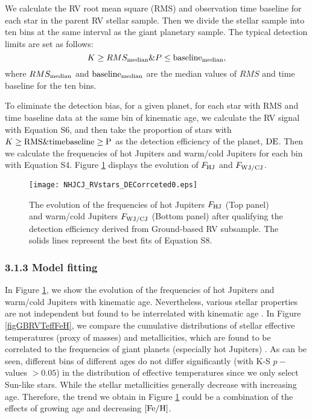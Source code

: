 \documentclass[twocolumn]{pnas-new}
\begin{document}
We calculate the RV root mean square (RMS) and observation time baseline for each star in the parent RV stellar sample.
Then we divide the stellar sample into ten bins at the same interval as the giant planetary sample.
The typical detection limits are set as follows:
\begin{equation}
  K \ge RMS_{\rm median} \&
  P \le \rm baseline_{\rm median},
\end{equation}
where $RMS_{\rm median}$ and
$\rm baseline_{\rm median}$ are the median values of $RMS$ and time baseline for the ten bins.


To eliminate the detection bias, for a given planet, for each star with RMS and time baseline data at the same bin of kinematic age, we calculate the RV signal with Equation S6, and then take the proportion of stars with $K \ge \rm RMS \& time baseline \ge P$ as the detection efficiency of the planet, $\rm DE$.
Then we calculate the frequencies of hot Jupiters and warm/cold Jupiters for each bin with Equation S4.
Figure \ref{figGBRVOccurrencerateDE} displays the evolution of $F_{\rm HJ}$ and $F_{\rm WJ/CJ}$.

\begin{figure}[!t]
\centering
\texttt{[image: NHJCJ\_RVstars\_DECorrceted0.eps]}
\caption{The evolution of the frequencies of hot Jupiters $F_{\rm HJ}$ (Top panel) and warm/cold Jupiters $F_{\rm WJ/CJ}$ (Bottom panel) after qualifying the detection efficiency derived from Ground-based RV subsample.
The solids lines represent the best fits of Equation S8.
\label{figGBRVOccurrencerateDE}}
\end{figure}


\subsubsection*{3.1.3 Model fitting}
\label{Sec.obs.RV.fitting}
In Figure \ref{figGBRVOccurrencerateDE}, we show the evolution of the frequencies of hot Jupiters and warm/cold Jupiters with kinematic age.
Nevertheless, various stellar properties are not independent but found to be interrelated with kinematic age \citep[e.g..][]{2014A&A...562A..71B,2022AJ....163..249C}.
In Figure \ref{figGBRVTeffFeH}, we compare the cumulative distributions of stellar effective temperatures (proxy of masses) and metallicities, which are found to be correlated to the frequencies of giant planets (especially hot Jupiters) \citep{1997MNRAS.285..403G,2005ApJ...622.1102F,2010PASP..122..905J,2016A&A...587A..64S}.
As can be seen, different bins of different ages do not differ significantly (with K-S $p-$ values $>0.05$) in the distribution of effective temperatures since we only select Sun-like stars.
While the stellar metallicities generally decrease with increasing age.
Therefore, the trend we obtain in Figure \ref{figGBRVOccurrencerateDE} could be a combination of the effects of growing age and decreasing $\rm [Fe/H]$.
\end{document}
